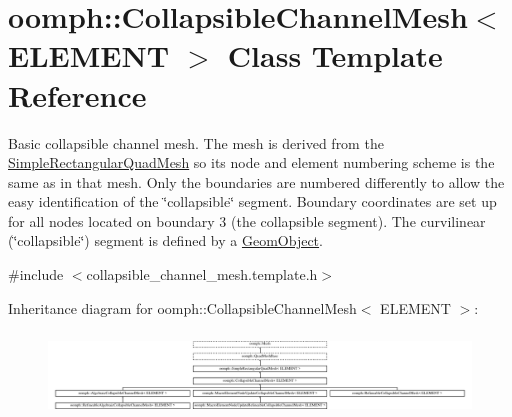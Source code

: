 \hypertarget{classoomph_1_1CollapsibleChannelMesh}{}\section{oomph\+:\+:Collapsible\+Channel\+Mesh$<$ E\+L\+E\+M\+E\+NT $>$ Class Template Reference}
\label{classoomph_1_1CollapsibleChannelMesh}


Basic collapsible channel mesh. The mesh is derived from the {\ttfamily \hyperlink{classoomph_1_1SimpleRectangularQuadMesh}{Simple\+Rectangular\+Quad\+Mesh}} so it\textquotesingle{}s node and element numbering scheme is the same as in that mesh. Only the boundaries are numbered differently to allow the easy identification of the \char`\"{}collapsible\char`\"{} segment. Boundary coordinates are set up for all nodes located on boundary 3 (the collapsible segment). The curvilinear (\char`\"{}collapsible\char`\"{}) segment is defined by a {\ttfamily \hyperlink{classoomph_1_1GeomObject}{Geom\+Object}}.  




{\ttfamily \#include $<$collapsible\+\_\+channel\+\_\+mesh.\+template.\+h$>$}

Inheritance diagram for oomph\+:\+:Collapsible\+Channel\+Mesh$<$ E\+L\+E\+M\+E\+NT $>$\+:\begin{figure}[H]
\begin{center}
\leavevmode
\includegraphics[height=2.262626cm]{classoomph_1_1CollapsibleChannelMesh}
\end{center}
\end{figure}
